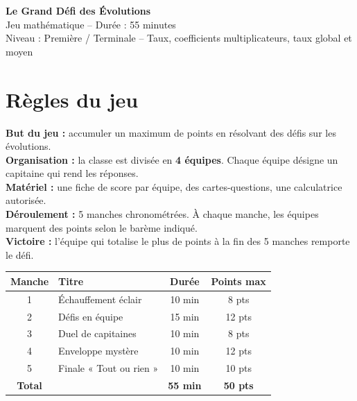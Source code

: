 \documentclass[12pt,a4paper]{article}
\begin{document}
\begin{center}
{\Huge\bfseries\color{bleufonce} Le Grand Défi des Évolutions}\\[0.3cm]
{\large Jeu mathématique -- Durée : 55 minutes}\\[0.2cm]
{\large Niveau : Première / Terminale -- Taux, coefficients multiplicateurs, taux global et moyen}
\end{center}

\vspace{0.3cm}

\section*{Règles du jeu}

\begin{regle}
\textbf{But du jeu :} accumuler un maximum de points en résolvant des défis sur les évolutions.\\[0.2cm]
\textbf{Organisation :} la classe est divisée en \textbf{4 équipes}. Chaque équipe désigne un capitaine qui rend les réponses.\\[0.2cm]
\textbf{Matériel :} une fiche de score par équipe, des cartes-questions, une calculatrice autorisée.\\[0.2cm]
\textbf{Déroulement :} 5 manches chronométrées. À chaque manche, les équipes marquent des points selon le barème indiqué.\\[0.2cm]
\textbf{Victoire :} l’équipe qui totalise le plus de points à la fin des 5 manches remporte le défi.
\end{regle}

\vspace{0.3cm}

\begin{center}
\renewcommand{\arraystretch}{1.4}
\begin{tabular}{|c|l|c|c|}
\hline
\textbf{Manche} & \textbf{Titre} & \textbf{Durée} & \textbf{Points max} \\
\hline
1 & Échauffement éclair & 10 min & 8 pts \\
\hline
2 & Défis en équipe & 15 min & 12 pts \\
\hline
3 & Duel de capitaines & 10 min & 8 pts \\
\hline
4 & Enveloppe mystère & 10 min & 12 pts \\
\hline
5 & Finale « Tout ou rien » & 10 min & 10 pts \\
\hline
\textbf{Total} & & \textbf{55 min} & \textbf{50 pts} \\
\hline
\end{tabular}
\end{center}
\end{document}
